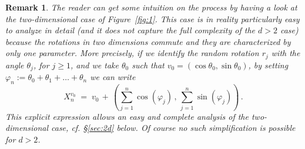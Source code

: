 \documentclass[a4paper,reqno,11pt]{amsart}
\numberwithin{equation}{section}
\newtheorem{rem}[theorem]{Remark}
\newcommand{\gp}{\varphi}
\begin{document}
\medskip
\begin{rem}\label{rem:2dsimple}
\rm The reader can get some intuition on the process by having a look at
the two-dimensional case of Figure~\ref{fig:1}. This case
is in reality particularly
easy to analyze in detail (and it does not capture the full
complexity of the $d>2$ case) because the rotations in two
dimensions commute and they
are characterized by only one parameter.
More precisely, if we identify the random rotation $r_j$
with the angle $\theta_j$, for $j \ge 1$, and we take $\theta_0$
such that $v_0 = (\cos \theta_0, \sin \theta_0)$, by setting
$\gp_n:= \theta_0 + \theta_1 + \ldots +
\theta_n$ we can write
\begin{equation}
	X_n^{v_0} \; =\; v_0 \,+\, \left( \sum_{j=1}^n \cos(\gp_j) \,,\,
	\sum_{j=1}^n \sin(\gp_j)\right) \,.
\end{equation}
This explicit expression allows an easy and complete
analysis of the two-dimensional case, {\sl cf.} \S\ref{sec:2d} below.
Of course no such simplification is possible for $d > 2$.
\end{rem}
\end{document}
